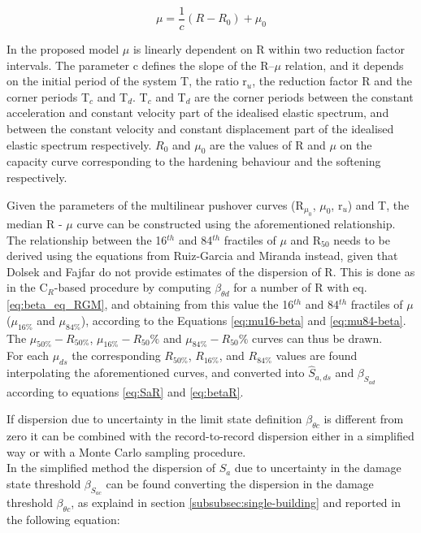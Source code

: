 \begin{equation}
\label{eq:mu_DF}
\mu = \frac{1}{c} (R-R_{0})+\mu_{0}
\end{equation}

In the proposed model $\mu$ is linearly dependent on R within two reduction factor intervals. The parameter c defines the slope of the R–$\mu$ relation, and it depends on the initial period of the system T, the ratio r$_{u}$, the reduction factor R and the corner periods T$_{c}$ and T$_{d}$. T$_{c}$ and T$_{d}$ are the corner periods between the constant acceleration and constant velocity part of the idealised elastic spectrum, and between the constant velocity and constant displacement part of the idealised elastic spectrum respectively. $R_{0}$ and $\mu_{0}$ are the values of R and $\mu$ on the capacity curve corresponding to the hardening behaviour and the softening respectively.

Given the parameters of the multilinear pushover curves (R$_{\mu_{0}}$, $\mu_{0}$, r$_{u}$) and T, the median R - $\mu$ curve can be constructed using the aforementioned relationship. 
The relationship between the 16$^{th}$ and 84$^{th}$ fractiles of $\mu$ and R$_{50}$ needs to be derived using the equations from Ruiz-Garcia and Miranda instead, given that Dolsek and Fajfar do not provide estimates of the dispersion of R. This is done as in the C$_R$-based procedure by computing $\beta_{\theta d}$ for a number of R with eq. \ref{eq:beta_eq_RGM}, and obtaining from this value the 16$^{th}$ and 84$^{th}$ fractiles of $\mu$ ($\mu_{16\%}$ and $\mu_{84\%}$), according to the Equations \ref{eq:mu16-beta} and \ref{eq:mu84-beta}. The $\mu_{50\%}-R_{50\%}$, $\mu_{16\%}-R_50\%$ and $\mu_{84\%}-R_50\%$ curves can thus be drawn.\\

For each $\mu_{ds}$ the corresponding $R_{50\%}$, $R_{16\%}$, and $R_{84\%}$ values are found interpolating the aforementioned curves, and converted into $\hat{S}_{a,ds}$ and $\beta_{S_{a d}}$ according to equations \ref{eq:SaR} and \ref{eq:betaR}.

If dispersion due to uncertainty in the limit state definition $\beta_{\theta c}$ is different from zero it can be combined with the record-to-record dispersion either in a simplified way or with a Monte Carlo sampling procedure.\\

In the simplified method the dispersion of $S_a$ due to uncertainty in the damage state threshold $\beta_{S_{a c}}$ can be found converting the dispersion in the damage threshold $\beta_{\theta c}$, as explaind in section \ref{subsubsec:single-building} and reported in the following equation:

